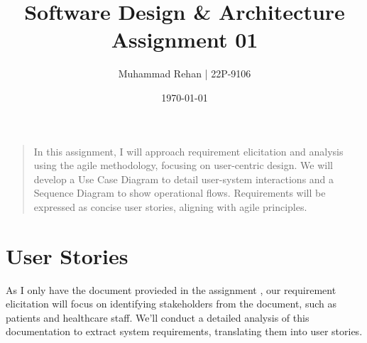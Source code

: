 \documentclass[12pt]{article} %
\title{Software Design \& Architecture\\ Assignment 01}
\author{Muhammad Rehan | 22P-9106}
\date{\today}
\begin{document}
\maketitle

\begin{quote}
 In this assignment, I will approach requirement elicitation and analysis using the agile methodology, focusing on user-centric design. We will develop a Use Case Diagram to detail user-system interactions and a Sequence Diagram to show operational flows. Requirements will be expressed as concise user stories, aligning with agile principles.
  \end{quote}
  

    \section*{User Stories}

    As I only have the document provieded in the assignment , our requirement elicitation will focus on identifying stakeholders from the document, such as patients and healthcare staff. We'll conduct a detailed analysis of this documentation to extract system requirements, translating them into user stories.
    
\end{document}
